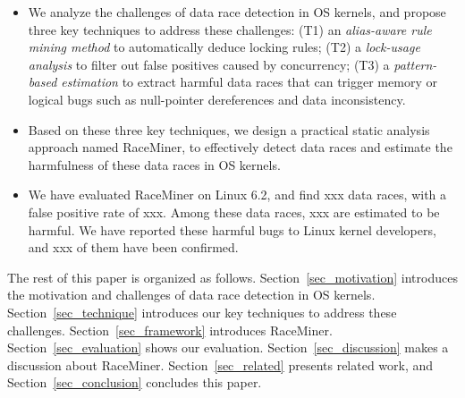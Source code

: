 \begin{itemize}
	\item We analyze the challenges of data race detection in OS kernels, and 
	propose three key techniques to address	these challenges: (T1) an {\em 
	alias-aware rule mining method} to automatically deduce locking rules; (T2) 
	a {\em lock-usage analysis} to filter out false positives caused by 
	concurrency; (T3) a {\em pattern-based estimation} to extract harmful data 
	races that can trigger memory or logical bugs such as null-pointer 
	dereferences and data inconsistency.
	\item Based on these three key techniques, we design a practical static 
	analysis approach named RaceMiner, to effectively detect data races and 
	estimate the harmfulness of these data races in OS kernels.
	\item We have evaluated RaceMiner on Linux 6.2, and find xxx data races, 	
	with a false positive rate of xxx. Among these data races, xxx are 
	estimated to be harmful. We have reported these harmful bugs to Linux 
	kernel developers, and xxx of them have been confirmed.
\end{itemize}

The rest of this paper is organized as follows. Section~\ref{sec_motivation} 
introduces the motivation and challenges of data race detection in OS kernels. 
Section~\ref{sec_technique} introduces our key techniques to address these 
challenges. Section~\ref{sec_framework} introduces RaceMiner. 
Section~\ref{sec_evaluation} shows our evaluation. Section~\ref{sec_discussion} 
makes a discussion about RaceMiner. Section~\ref{sec_related} presents related 
work, and Section~\ref{sec_conclusion} concludes this paper.
